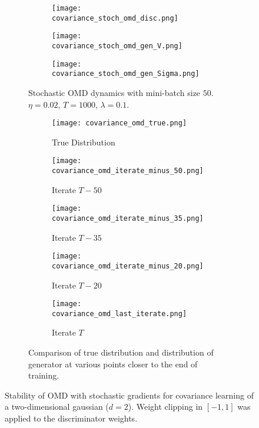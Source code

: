 \begin{figure}[H]
    \centering
    \begin{subfigure}[b]{1\textwidth}
        \centering
    		\begin{subfigure}[b]{.3\textwidth}
    		\texttt{[image: covariance\_stoch\_omd\_disc.png]}
			\end{subfigure}        
    		\begin{subfigure}[b]{.3\textwidth}
    		\texttt{[image: covariance\_stoch\_omd\_gen\_V.png]}
			\end{subfigure}        
    		\begin{subfigure}[b]{.3\textwidth}
    		\texttt{[image: covariance\_stoch\_omd\_gen\_Sigma.png]}
			\end{subfigure}        
        \caption{Stochastic OMD dynamics with mini-batch size $50$. $\eta=0.02$, $T=1000$, $\lambda=0.1$.}
    \end{subfigure}
    \begin{subfigure}[b]{1.01\textwidth}
    		\begin{subfigure}[b]{.19\textwidth}   
    		\hspace{-.3in}     	
    		\texttt{[image: covariance\_omd\_true.png]}
    		\caption{True Distribution}
			\end{subfigure}        
    		\begin{subfigure}[b]{.19\textwidth}
    		\hspace{-.3in}     	
    		\texttt{[image: covariance\_omd\_iterate\_minus\_50.png]}
    		\caption{Iterate $T-50$}
			\end{subfigure}   
    		\begin{subfigure}[b]{.19\textwidth}
    		\hspace{-.3in}     	
    		\texttt{[image: covariance\_omd\_iterate\_minus\_35.png]}
    		\caption{Iterate $T-35$}
			\end{subfigure}   
    		\begin{subfigure}[b]{.19\textwidth}
    		\hspace{-.3in}     	
    		\texttt{[image: covariance\_omd\_iterate\_minus\_20.png]}
    		\caption{Iterate $T-20$}
			\end{subfigure}  
    		\begin{subfigure}[b]{.19\textwidth}
    		\hspace{-.3in}     	
    		\texttt{[image: covariance\_omd\_last\_iterate.png]}
    		\caption{Iterate $T$}
			\end{subfigure}  
    	\caption{Comparison of true distribution and distribution of generator at various points closer to the end of training.}
    \end{subfigure}
    \caption{Stability of OMD with stochastic gradients for covariance learning of a two-dimensional gaussian ($d=2$). Weight clipping in $[-1,1]$ was applied to the discriminator weights.}\label{fig:stoch_covariance2}
\end{figure}


